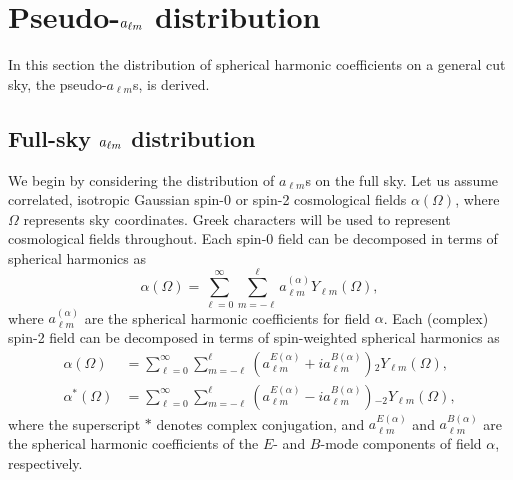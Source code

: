 \section{Pseudo-\texorpdfstring{$a_{\ell m}$}{alm} distribution}
\label{el_Sec:pseudo_alm_dist}

In this section the distribution of spherical harmonic coefficients on a general cut sky, the pseudo-$a_{\ell m}$s, is derived.

\subsection{Full-sky \texorpdfstring{$a_{\ell m}$}{alm} distribution}
\label{el_Sec:Full_sky_alm_dist}

We begin by considering the distribution of $a_{\ell m}$s on the full sky. Let us assume correlated, isotropic Gaussian spin-0 or spin-2 cosmological fields $\alpha \left( \Omega \right)$, where $\Omega$ represents sky coordinates. Greek characters will be used to represent cosmological fields throughout. Each spin-0 field can be decomposed in terms of spherical harmonics as
\begin{equation}
    \alpha \left( \Omega \right) =
    \sum_{\ell = 0}^\infty \sum_{m = -\ell}^\ell
    a_{\ell m}^{\left( \alpha \right)} Y_{\ell m} \left( \Omega \right),
\end{equation}
where $a_{\ell m}^{\left( \alpha \right)}$ are the spherical harmonic coefficients for field $\alpha$. Each (complex) spin-2 field can be decomposed in terms of spin-weighted spherical harmonics as
\begin{align}
\alpha \left( \Omega \right) &=
\sum_{\ell = 0}^\infty \sum_{m = -\ell}^\ell
\left( a_{\ell m}^{E \left( \alpha \right)} + i a_{\ell m}^{B \left( \alpha \right)} \right)
{}_2Y_{\ell m} \left( \Omega \right), \\
\alpha^* \left( \Omega \right) &=
\sum_{\ell = 0}^\infty \sum_{m = -\ell}^\ell
\left( a_{\ell m}^{E \left( \alpha \right)} - i a_{\ell m}^{B \left( \alpha \right)} \right)
{}_{-2}Y_{\ell m} \left( \Omega \right),
\end{align}
where the superscript $*$ denotes complex conjugation, and $a_{\ell m}^{E \left( \alpha \right)}$ and $a_{\ell m}^{B \left( \alpha \right)}$ are the spherical harmonic coefficients of the $E$- and $B$-mode components of field $\alpha$, respectively.

